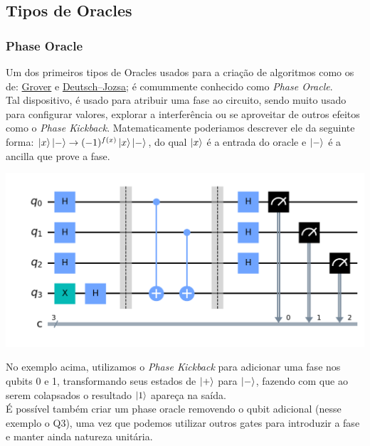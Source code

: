 \documentclass{article}
\begin{document}
\subsection{Tipos de Oracles}

\subsubsection{Phase Oracle}
Um dos primeiros tipos de Oracles usados para a criação de algoritmos como os de: \href{https://en.wikipedia.org/wiki/Grover%27s_algorithm}{Grover} e \href{https://en.wikipedia.org/wiki/Deutsch%E2%80%93Jozsa_algorithm}{Deutsch–Jozsa}; é comummente conhecido como \emph{Phase Oracle}.\\
Tal dispositivo, é usado para atribuir uma fase ao circuito, sendo muito usado para configurar valores, explorar a interferência ou se aproveitar de outros efeitos como o \textit{Phase Kickback}. Matematicamente poderiamos descrever ele da seguinte forma: $\mathinner{|{x}\rangle}\mathinner{|{-}\rangle} \to (-1)^{f(x)}\mathinner{|{x}\rangle}\mathinner{|{-}\rangle}$, do qual $\mathinner{|{x}\rangle}$ é a entrada do oracle e $\mathinner{|{-}\rangle}$ é a ancilla que prove a fase.

\begin{center}
	\includegraphics[scale=0.3]{phase_oracle_1.png}
	\label{fig:phase-oracle-1}
\end{center}

No exemplo acima, utilizamos o \textit{Phase Kickback} para adicionar uma fase nos qubits 0 e 1, transformando seus estados de $\mathinner{|{+}\rangle}$ para $\mathinner{|{-}\rangle}$, fazendo com que ao serem colapsados o resultado $\mathinner{|{1}\rangle}$ apareça na saída.\\

É possível também criar um phase oracle removendo o qubit adicional (nesse exemplo o Q3), uma vez que podemos utilizar outros gates para introduzir a fase e manter ainda natureza unitária.
\end{document}
